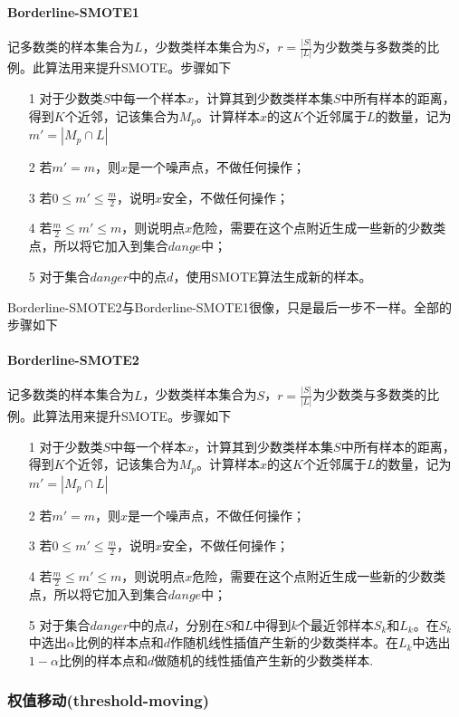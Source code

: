 \paragraph{Borderline-SMOTE1}记多数类的样本集合为$L$，少数类样本集合为$S$，$r=\frac{|S|}{|L|}$为少数类与多数类的比例。此算法用来提升SMOTE。步骤如下
\begin{itemize}
\item[1] 对于少数类$S$中每一个样本$x$，计算其到少数类样本集$S$中所有样本的距离，得到$K$个近邻，记该集合为$M_p$。计算样本$x$的这$K$个近邻属于$L$的数量，记为$m'=|M_p\cap L|$
\item[2] 若$m'=m$，则$x$是一个噪声点，不做任何操作；
\item[3] 若$0\leq m'\leq \frac{m}{2}$，说明$x$安全，不做任何操作；
\item[4] 若$\frac{m}{2}\leq m' \leq m$，则说明点$x$危险，需要在这个点附近生成一些新的少数类点，所以将它加入到集合$dange$中；
\item[5] 对于集合$danger$中的点$d$，使用SMOTE算法生成新的样本。
\end{itemize}

Borderline-SMOTE2与Borderline-SMOTE1很像，只是最后一步不一样。全部的步骤如下
\paragraph{Borderline-SMOTE2}记多数类的样本集合为$L$，少数类样本集合为$S$，$r=\frac{|S|}{|L|}$为少数类与多数类的比例。此算法用来提升SMOTE。步骤如下
\begin{itemize}
\item[1] 对于少数类$S$中每一个样本$x$，计算其到少数类样本集$S$中所有样本的距离，得到$K$个近邻，记该集合为$M_p$。计算样本$x$的这$K$个近邻属于$L$的数量，记为$m'=|M_p\cap L|$
\item[2] 若$m'=m$，则$x$是一个噪声点，不做任何操作；
\item[3] 若$0\leq m'\leq \frac{m}{2}$，说明$x$安全，不做任何操作；
\item[4] 若$\frac{m}{2}\leq m' \leq m$，则说明点$x$危险，需要在这个点附近生成一些新的少数类点，所以将它加入到集合$dange$中；
\item[5] 对于集合$danger$中的点$d$，分别在$S$和$L$中得到$k$个最近邻样本$S_k$和$L_k$。在$S_k$中选出$\alpha$比例的样本点和$d$作随机线性插值产生新的少数类样本。在$L_k$中选出$1-\alpha$比例的样本点和$d$做随机的线性插值产生新的少数类样本.
\end{itemize}
\subsubsection{权值移动(threshold-moving)}








